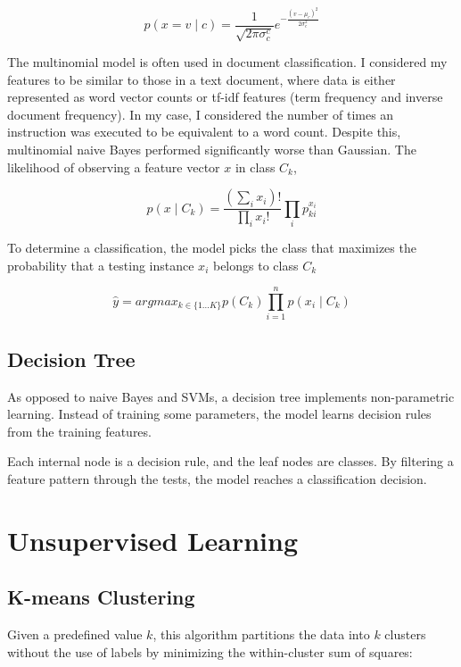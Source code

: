 \begin{equation}
	p(x= v \mid c) = \frac{1}{\sqrt{2\pi\sigma_c^c}}e^{-\frac{(v-\mu_c)^2}{2\sigma_c^2}}\label{gaussianbayes}
\end{equation}

The multinomial model is often used in document classification.  I considered my features to be similar to those in a text document, where data is either represented as word vector counts or tf-idf features (term frequency and inverse document frequency).  In my case, I considered the number of times an instruction was executed to be equivalent to a word count.  Despite this, multinomial naive Bayes performed significantly worse than Gaussian.  The likelihood of observing a feature vector $x$ in class $C_k$,

\begin{equation}
	p(x \mid C_k ) = \frac{(\sum_i x_i)!}{\prod_i x_i !}\prod_i p_{ki}^{x_i}
	\label{multinomialbayes}
\end{equation}

To determine a classification, the model picks the class that maximizes the probability that a testing instance $x_i$ belongs to class $C_k$

\begin{equation}
\hat{y} = argmax_{k\in\{1\ldots K\}} p(C_k) \prod_{i=1}^n p(x_i \mid C_k) \label{naivebayes}
\end{equation}


\subsection{Decision Tree}
As opposed to naive Bayes and SVMs, a decision tree implements non-parametric learning.  Instead of training some parameters, the model learns decision rules from the training features.

Each internal node is a decision rule, and the leaf nodes are classes.  By filtering a feature pattern through the tests, the model reaches a classification decision.




\section{Unsupervised Learning}
\subsection{K-means Clustering}
Given a predefined value $k$, this algorithm partitions the data into $k$ clusters without the use of labels by minimizing the within-cluster sum of squares:

